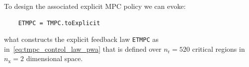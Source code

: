 \documentclass[letterpaper, 10 pt, conference]{ieeeconf}
\begin{document}
To design the associated explicit MPC policy we can evoke:
\begin{verbatim}
	ETMPC = TMPC.toExplicit
\end{verbatim}
what constructs the explicit feedback law \verb|ETMPC| as in~\eqref{eq:tmpc_control_law_pwa} that is defined over $n_\text{r} = 520$ critical regions in $n_\text{x} = 2$ dimensional space.


%

\end{document}
